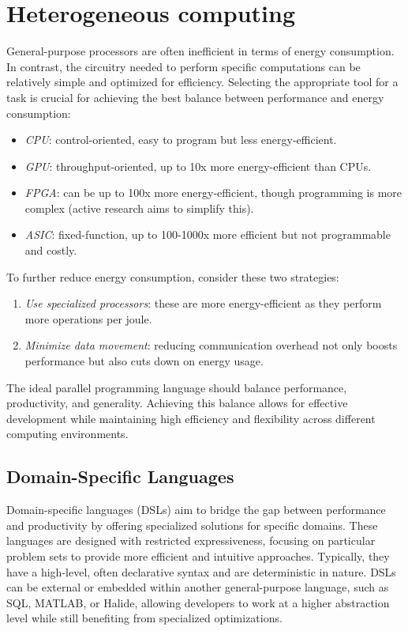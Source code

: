 \section{Heterogeneous computing}

General-purpose processors are often inefficient in terms of energy consumption. 
In contrast, the circuitry needed to perform specific computations can be relatively simple and optimized for efficiency. 
Selecting the appropriate tool for a task is crucial for achieving the best balance between performance and energy consumption:
\begin{itemize}
    \item \textit{CPU}: control-oriented, easy to program but less energy-efficient.
    \item \textit{GPU}: throughput-oriented, up to 10x more energy-efficient than CPUs.
    \item \textit{FPGA}: can be up to 100x more energy-efficient, though programming is more complex (active research aims to simplify this).
    \item \textit{ASIC}: fixed-function, up to 100-1000x more efficient but not programmable and costly. 
\end{itemize}
To further reduce energy consumption, consider these two strategies:
\begin{enumerate}
    \item \textit{Use specialized processors}: these are more energy-efficient as they perform more operations per joule.
    \item \textit{Minimize data movement}: reducing communication overhead not only boosts performance but also cuts down on energy usage.
\end{enumerate}
The ideal parallel programming language should balance performance, productivity, and generality. 
Achieving this balance allows for effective development while maintaining high efficiency and flexibility across different computing environments.

\subsection{Domain-Specific Languages}
Domain-specific languages (DSLs) aim to bridge the gap between performance and productivity by offering specialized solutions for specific domains.
These languages are designed with restricted expressiveness, focusing on particular problem sets to provide more efficient and intuitive approaches. 
Typically, they have a high-level, often declarative syntax and are deterministic in nature. 
DSLs can be external or embedded within another general-purpose language, such as SQL, MATLAB, or Halide, allowing developers to work at a higher abstraction level while still benefiting from specialized optimizations.

